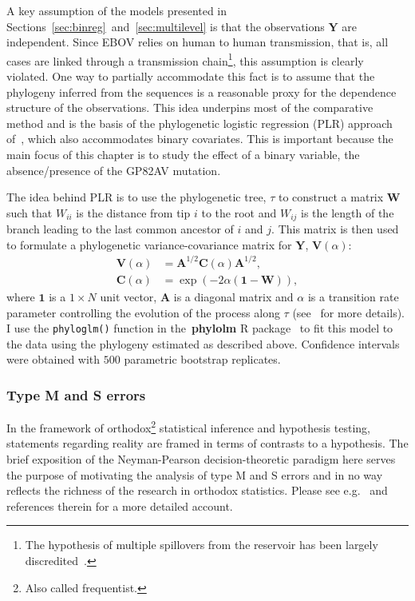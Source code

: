 A key assumption of the models presented in Sections~\ref{sec:binreg}~and~\ref{sec:multilevel} is that the observations $\boldsymbol Y$ are independent.
Since EBOV relies on human to human transmission, that is, all cases are linked through a transmission chain\footnote{The hypothesis of multiple spillovers from the reservoir has been largely discredited~\citep{Baize2014, Gire2014}.}, this assumption is clearly violated.
One way to partially accommodate this fact is to assume that the phylogeny inferred from the sequences is a reasonable proxy for the dependence structure of the observations.
This idea underpins most of the comparative method and is the basis of the phylogenetic logistic regression (PLR) approach of~\cite{Ives2009}, which also accommodates binary covariates.
This is important because the main focus of this chapter is to study the effect of a binary variable, the absence/presence of the GP82AV mutation.

The idea behind PLR is to use the phylogenetic tree, $\tau$ to construct a matrix $\boldsymbol W$ such that $W_{ii}$ is the distance from tip $i$ to the root and $W_{ij}$ is the length of the branch leading to the last common ancestor of $i$ and $j$.
This matrix is then used to formulate a phylogenetic variance-covariance matrix for $\boldsymbol Y$, $\boldsymbol V(\alpha)$:
\begin{align}
 \boldsymbol V(\alpha) &= \boldsymbol A^{1/2}  \boldsymbol C(\alpha)  \boldsymbol A^{1/2}, \\
  \boldsymbol C(\alpha) &= \exp\left(-2\alpha\left( \boldsymbol 1 - \boldsymbol W \right) \right), 
\end{align}
where $\boldsymbol 1$ is a $1 \times N$ unit vector, $\boldsymbol A$ is a diagonal matrix and $\alpha$ is a transition rate parameter controlling the evolution of the process along $\tau$ (see~\cite{Ives2009} for more details).
I use the \verb|phyloglm()| function in the~\textbf{phylolm} R package~\citep{Lam2014} to fit this model to the data using the phylogeny estimated as described above.
Confidence intervals were obtained with $500$ parametric bootstrap replicates.
 
\subsubsection{Type M and S errors}
\label{sec:MSerror}

In the framework of orthodox\footnote{Also called frequentist.} statistical inference and hypothesis testing, statements regarding reality are framed in terms of contrasts to a hypothesis.
The brief exposition of the Neyman-Pearson decision-theoretic paradigm here serves the purpose of motivating the analysis of type M and S errors and in no way reflects the richness of the research in orthodox statistics.
Please see e.g.~\cite{Casella2002} and references therein for a more detailed account.


